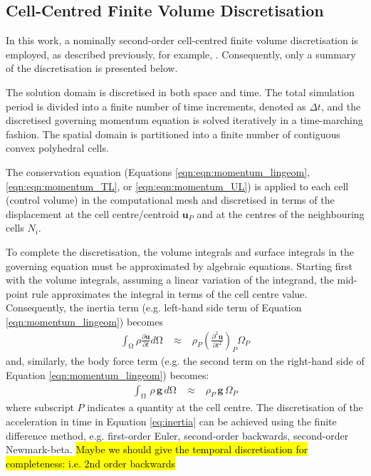 \documentclass[sn-mathphys,Numbered,draft]{sn-jnl}%
\newcommand{\bb}{\boldsymbol}
\begin{document}
\subsection{Cell-Centred Finite Volume Discretisation}
\label{sec:discretisation}
In this work, a nominally second-order cell-centred finite volume discretisation is employed, as described previously, for example, \citep{cardiff_lagrangian_2017, Batistic, Tukovic, Jasak}.
Consequently, only a summary of the discretisation is presented below.

The solution domain is discretised in both space and time.
The total simulation period is divided into a finite number of time increments, denoted as $\Delta t$, and the discretised governing momentum equation is solved iteratively in a time-marching fashion. The spatial domain is partitioned into a finite number of contiguous convex polyhedral cells.

The conservation equation (Equations \ref{eqn:eqn:momentum_lingeom}, \ref{eqn:eqn:momentum_TL}, or \ref{eqn:eqn:momentum_UL}) is applied to each cell (control volume) in the computational mesh and discretised in terms of the displacement at the cell centre/centroid $\bb{u}_P$ and at the centres of the neighbouring cells $N_i$.

To complete the discretisation, the volume integrals and surface integrals in the governing equation must be approximated by algebraic equations.
Starting first with the volume integrals, assuming a linear variation of the integrand, the mid-point rule approximates the integral in terms of the cell centre value.
Consequently, the inertia term (e.g. left-hand side term of Equation \ref{eqn:momentum_lingeom}) becomes
\begin{eqnarray} \label{eq:inertia}
	\int_{\mathrm{\Omega}} \rho \frac{\partial \bb{u} }{\partial t}  d\mathrm{\Omega}
	\;&\approx&\;
	\rho_P \left(\frac{\partial^2 \bb{u} }{\partial t^2}\right)_P  \Omega_P
\end{eqnarray}
and, similarly, the body force term (e.g. the second term on the right-hand side of Equation \ref{eqn:momentum_lingeom}) becomes:
\begin{eqnarray}
	\int_{\mathrm{\Omega}} \, \rho \, \bb{g} \,  d\mathrm{\Omega}
	\;&\approx&\;
	\rho_P \, \bb{g}\,  \Omega_P
\end{eqnarray}
where subscript $P$ indicates a quantity at the cell centre.
The discretisation of the acceleration in time in Equation \ref{eq:inertia} can be achieved using the finite difference method, e.g. first-order Euler, second-order backwards, second-order Newmark-beta.
\hl{Maybe we should give the temporal discretisation for completeness: i.e. 2nd order backwards}
\end{document}
